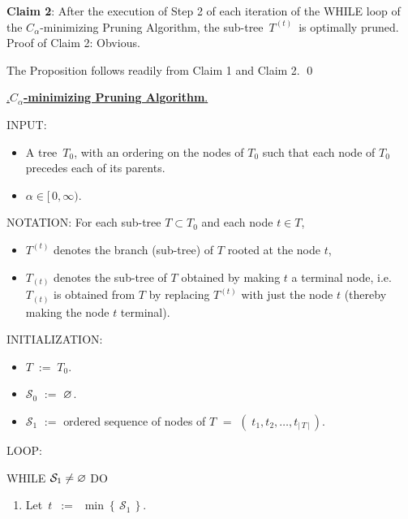 \vskip 0.5cm
\noindent
\textbf{Claim 2}:\quad
After the execution of Step 2 of each iteration of the WHILE loop of the $C_{\alpha}$-minimizing Pruning Algorithm,
the sub-tree \,$T^{(t)}$\, is optimally pruned.
\vskip 0.2cm
\noindent
Proof of Claim 2:\quad
Obvious.

\vskip 0.3cm
\noindent
The Proposition follows readily from Claim 1 and Claim 2.
\qed

\begin{center}
\begin{tcolorbox}[width=0.90\linewidth,colback=white,colframe=gray]
\begin{center}
\vskip 0.2cm
\underline{{\color{white}.}\textbf{\large$C_{\alpha}$-minimizing Pruning Algorithm}{\color{white}.}}
\end{center}
\vskip 0.5cm
INPUT:
\begin{itemize}
\item
	A tree \,$T_{0}$, with an ordering on the nodes of $T_{0}$
	such that each node of $T_{0}$ precedes each of its parents.
\item
	$\alpha \in [\,0,\infty)$.
\end{itemize}
\vskip 0.3cm
NOTATION:
\vskip 0.2cm
For each sub-tree $T \subset T_{0}$ and each node $t \in T$,
\begin{itemize}
\item
	$T^{(t)}$ denotes the branch (sub-tree) of $T$ rooted at the node $t$,
\item
	$T_{(t)}$ denotes the sub-tree of $T$ obtained by making $t$ a terminal node,
	i.e. $T_{(t)}$ is obtained from $T$ by replacing $T^{(t)}$
	with just the node $t$ (thereby making the node $t$ terminal).
\end{itemize}
\vskip 0.3cm
INITIALIZATION:
\begin{itemize}
\item
	$T \; := \; T_{0}$.
\item
	$\mathcal{S}_{0}$ \;$:=$\; $\varnothing$.
\item
	$\mathcal{S}_{1}$
	\;$:=$\;
		\textnormal{ordered sequence of nodes of $T$}
	\;$=$\;
		$\left(\;t_{1}, t_{2}, \ldots, t_{\vert\,T\,\vert}\,\right)$.
\end{itemize}
\vskip 0.3cm
LOOP:
\vskip 0.1cm
\begin{center}
\begin{minipage}{0.85\linewidth}
WHILE \;$\mathcal{S}_{1} \neq \varnothing$\; DO
\begin{enumerate}
\item
	Let \,$t$ \,$:=$\, $\min\!\left\{\,\mathcal{S}_{1}\,\right\}$.

\end{enumerate}
\end{minipage}
\end{center}
\end{tcolorbox}
\end{center}
